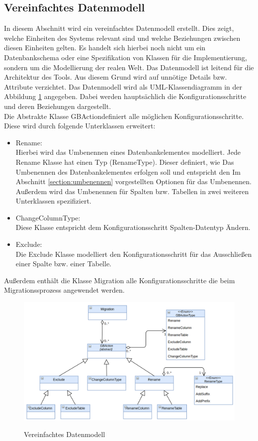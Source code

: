 \subsection{Vereinfachtes Datenmodell}
In diesem Abschnitt wird ein vereinfachtes Datenmodell erstellt. Dies zeigt, welche Einheiten des Systems relevant sind und welche Beziehungen zwischen diesen Einheiten gelten. Es handelt sich hierbei noch nicht um ein Datenbankschema oder eine Spezifikation von Klassen für die Implementierung, sondern um
die Modellierung der realen Welt. Das Datenmodell ist leitend für die Architektur des Tools. Aus diesem Grund wird auf unnötige Details bzw. Attribute verzichtet.
Das Datenmodell wird als UML-Klassendiagramm in der Abbildung \ref{img:abstract-datenmodell} angegeben. Dabei werden hauptsächlich die Konfigurationsschritte und deren Beziehungen dargestellt. \\
Die Abstrakte Klasse \glqq GBAction\grqq definiert alle möglichen Konfigurationsschritte. Diese wird durch folgende Unterklassen erweitert:
\begin{itemize}
	\item Rename: \\
	Hierbei wird das Umbenennen eines Datenbankelementes modelliert. Jede Rename Klasse hat einen Typ (RenameType). Dieser definiert, wie Das Umbenennen des Datenbankelementes erfolgen soll und entspricht den Im Abschnitt \ref{section:umbenennen} vorgestellten Optionen für das Umbenennen. Außerdem wird das Umbenennen für Spalten bzw. Tabellen in zwei weiteren Unterklassen spezifiziert.
	\item ChangeColumnType: \\
	Diese Klasse entspricht dem Konfigurationsschritt \glqq Spalten-Datentyp Ändern\grqq.  
	\item Exclude: \\
	Die Exclude Klasse modelliert den Konfigurationsschritt für das Ausschließen einer Spalte bzw. einer Tabelle.
	\end{itemize}
Außerdem enthält die Klasse Migration alle Konfigurationsschritte die beim Migrationssprozess angewendet werden.
\begin{figure}[H]
	\caption{Vereinfachtes Datenmodell}
	\centering
	\includegraphics[width=\textwidth]{images/sichten/abstract-datenmodell}
	\label{img:abstract-datenmodell}
\end{figure}







